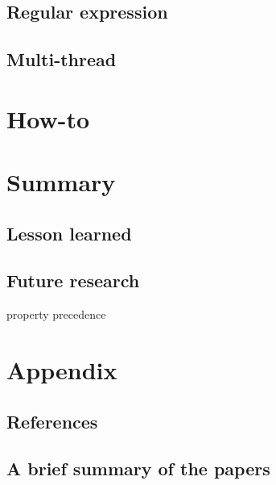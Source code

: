 \documentclass[12pt]{cls}
\begin{document}
\section{Regular expression}

\section{Multi-thread}

\chapter{How-to}

\chapter{Summary}
\section{Lesson learned}
\section{Future research}

property precedence

\chapter{Appendix}
\section{References}
\section{A brief summary of the papers}





\cleardoublepage

 
\end{document}
